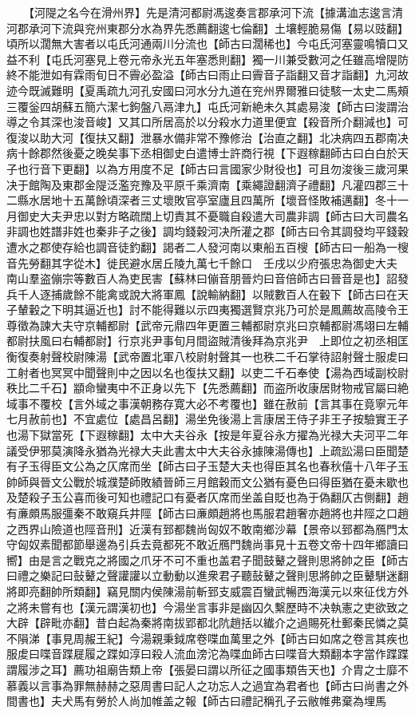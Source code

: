 　　【河隄之名今在滑州界】先是清河都尉馮逡奏言郡承河下流【據溝洫志逡言清河郡承河下流與兖州東郡分水為界先悉薦翻逡七倫翻】土壤輕脆易傷【易以豉翻】頃所以濶無大害者以屯氏河通兩川分流也【師古曰濶稀也】今屯氏河塞靈鳴犢口又益不利【屯氏河塞見上卷元帝永光五年塞悉則翻】獨一川兼受數河之任雖高增隄防終不能泄如有霖雨旬日不霽必盈溢【師古曰雨止曰霽音子詣翻又音才詣翻】九河故迹今既滅難明【夏禹疏九河孔安國曰河水分九道在兖州界爾雅曰徒駭一太史二馬頰三覆釡四胡蘇五簡六潔七鉤盤八鬲津九】屯氏河新絶未久其處易浚【師古曰浚謂治導之令其深也浚音峻】又其口所居高於以分殺水力道里便宜【殺音所介翻減也】可復浚以助大河【復扶又翻】泄暴水備非常不豫修治【治直之翻】北决病四五郡南决病十餘郡然後憂之晚矣事下丞相御史白遣博士許商行視【下遐稼翻師古曰白白於天子也行音下更翻】以為方用度不足【師古曰言國家少財役也】可且勿浚後三歲河果决于館陶及東郡金隄泛濫兖豫及平原千乘濟南【乘繩證翻濟子禮翻】凡灌四郡三十二縣水居地十五萬餘頃深者三丈壞敗官亭室廬且四萬所【壞音怪敗補邁翻】冬十一月御史大夫尹忠以對方略疏闊上切責其不憂職自殺遣大司農非調【師古曰大司農名非調也姓譜非姓也秦非子之後】調均錢穀河决所灌之郡【師古曰令其調發均平錢穀遭水之郡使存給也調音徒釣翻】謁者二人發河南以東船五百㮴【師古曰一船為一㮴音先勞翻其字從木】徙民避水居丘陵九萬七千餘口　壬戌以少府張忠為御史大夫　南山羣盗傰宗等數百人為吏民害【蘇林曰傰音朋晉灼曰音倍師古曰晉音是也】詔發兵千人逐捕歲餘不能禽或說大將軍鳳【說輸納翻】以賊數百人在轂下【師古曰在天子輦轂之下明其逼近也】討不能得難以示四夷獨選賢京兆乃可於是鳳薦故高陵令王尊徵為諫大夫守京輔都尉【武帝元鼎四年更置三輔都尉京兆曰京輔都尉馮翊曰左輔都尉扶風曰右輔都尉】行京兆尹事旬月間盜賊清後拜為京兆尹　上即位之初丞相匡衡復奏射聲校尉陳湯【武帝置北軍八校尉射聲其一也秩二千石掌待詔射聲士服䖍曰工射者也冥冥中聞聲則中之因以名也復扶又翻】以吏二千石奉使【湯為西域副校尉秩比二千石】顓命蠻夷中不正身以先下【先悉薦翻】而盗所收康居財物戒官屬曰絶域事不覆校【言外域之事漢朝務存寛大必不考覆也】雖在赦前【言其事在竟寧元年七月赦前也】不宜處位【處昌呂翻】湯坐免後湯上言康居王侍子非王子按驗實王子也湯下獄當死【下遐稼翻】太中大夫谷永【按是年夏谷永方擢為光禄大夫河平二年議受伊邪莫演降永猶為光禄大夫此書太中大夫谷永據陳湯傳也】上疏訟湯曰臣聞楚有子玉得臣文公為之仄席而坐【師古曰子玉楚大夫也得臣其名也春秋僖十八年子玉帥師與晉文公戰於城濮楚師敗績晉師三月館穀而文公猶有憂色曰得臣猶在憂未歇也及楚殺子玉公喜而後可知也禮記口有憂者仄席而坐盖自貶也為于偽翻仄古側翻】趙有亷頗馬服彊秦不敢窺兵井陘【師古曰亷頗趙將也馬服君趙奢亦趙將也井陘之口趙之西界山險道也陘音刑】近漢有郅都魏尚匈奴不敢南鄉沙幕【景帝以郅都為鴈門太守匈奴素聞都節舉邊為引兵去竟都死不敢近鴈門魏尚事見十五卷文帝十四年鄉讀曰嚮】由是言之戰克之將國之爪牙不可不重也盖君子聞鼓鼙之聲則思將帥之臣【師古曰禮之樂記曰鼔鼙之聲讙讙以立動動以進衆君子聽鼔鼙之聲則思將帥之臣鼙駢迷翻將即亮翻帥所類翻】竊見關内侯陳湯前斬郅支威震百蠻武暢西海漢元以來征伐方外之將未嘗有也【漢元謂漢初也】今湯坐言事非是幽囚久繫歷時不决執憲之吏欲致之大辟【辟毗亦翻】昔白起為秦將南拔郢都北阬趙括以纎介之過賜死杜郵秦民憐之莫不隕涕【事見周赧王紀】今湯親秉鉞席卷喋血萬里之外【師古曰如席之卷言其疾也服䖍曰喋音蹀屣履之蹀如淳曰殺人流血滂沱為喋血師古曰喋音大類翻本字當作蹀蹀謂履涉之耳】薦功祖廟告類上帝【張晏曰謂以所征之國事類告天也】介胄之士靡不慕義以言事為罪無赫赫之惡周書曰記人之功忘人之過宜為君者也【師古曰尚書之外間書也】夫犬馬有勞於人尚加帷盖之報【師古曰禮記稱孔子云敝帷弗棄為埋馬